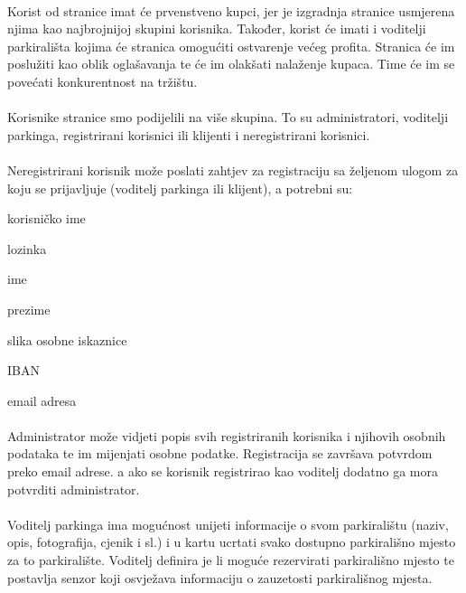 \paragraph*{}{Korist od stranice imat će prvenstveno kupci, jer je izgradnja stranice usmjerena njima kao najbrojnijoj skupini korisnika. Također, korist će imati i voditelji parkirališta kojima će stranica omogućiti ostvarenje većeg profita. Stranica će im poslužiti kao oblik oglašavanja te će im olakšati nalaženje kupaca. Time će im se povećati konkurentnost na tržištu.}
\paragraph*{}{
Korisnike stranice smo podijelili na više skupina. To su administratori, voditelji parkinga, registrirani korisnici ili klijenti i neregistrirani korisnici.}
\paragraph*{}{Neregistrirani korisnik može poslati zahtjev za registraciju sa željenom ulogom za koju se prijavljuje (voditelj parkinga ili klijent), a potrebni su: }
\begin{packed_item}
	\item {korisničko ime}
	\item {lozinka}
	\item {ime}
	\item {prezime}
	\item {slika osobne iskaznice}
	\item {IBAN}
	\item {email adresa}
\end{packed_item}
\paragraph*{}Administrator može vidjeti popis svih registriranih korisnika i njihovih osobnih podataka te im mijenjati osobne podatke. Registracija se završava potvrdom preko email adrese. a ako se korisnik registrirao kao voditelj dodatno ga mora potvrditi administrator.
\paragraph*{}{Voditelj parkinga ima mogućnost unijeti informacije o svom parkiralištu (naziv, opis, fotografija, cjenik i sl.) i u kartu ucrtati svako dostupno parkirališno mjesto za to parkiralište. Voditelj definira je li moguće rezervirati parkirališno mjesto te postavlja senzor koji osvježava informaciju o zauzetosti parkirališnog mjesta.}
